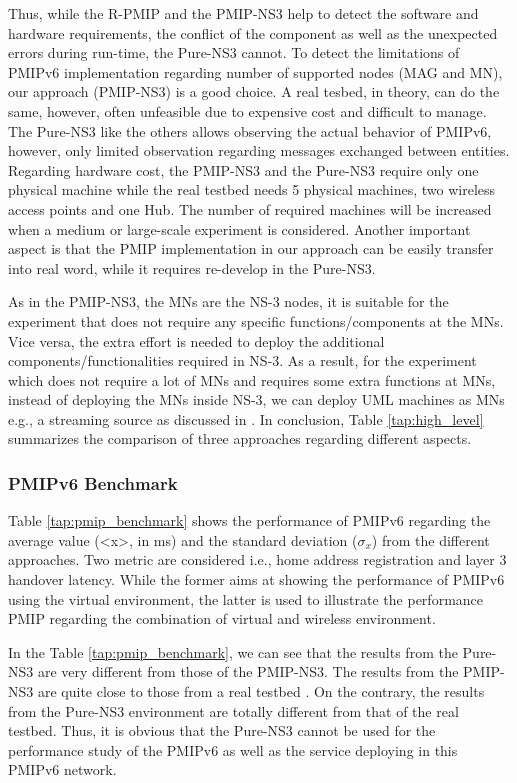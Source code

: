 Thus, while the R-PMIP and the PMIP-NS3 help to detect the software and hardware requirements, the conflict of the component as well as the unexpected errors during run-time, the Pure-NS3 cannot. To detect the limitations of PMIPv6 implementation regarding number of supported nodes (MAG and MN), our approach (PMIP-NS3) is a good choice. A real tesbed, in theory, can do the same, however, often unfeasible due to expensive cost and difficult to manage. The Pure-NS3 like the others allows observing the actual behavior of PMIPv6, however, only limited observation regarding messages exchanged between entities. Regarding hardware cost, the PMIP-NS3 and the Pure-NS3 require only one physical machine while the real testbed needs 5 physical machines, two wireless access points and one Hub. The number of required machines will be increased when a medium or large-scale experiment is considered. Another important aspect is that the PMIP implementation in our approach can be easily transfer into real word, while it requires re-develop in the Pure-NS3. 

As in the PMIP-NS3, the MNs are the NS-3 nodes, it is suitable for the experiment that does not require any specific functions/components at the MNs. Vice versa, the extra effort is needed to deploy the additional components/functionalities required in NS-3. As a result, for the experiment which does not require a lot of MNs and requires some extra functions at MNs, instead of deploying the MNs inside NS-3, we can deploy UML machines as MNs e.g., a streaming source as discussed in \cite{Thinh_Springer}. In conclusion, Table \ref{tap:high_level} summarizes the comparison of three approaches regarding different aspects. 
\subsubsection{PMIPv6 Benchmark}
Table \ref{tap:pmip_benchmark} shows the performance of PMIPv6 regarding the average value (<x>, in ms) and the standard deviation ($\sigma_{x}$) from the different approaches. Two metric are considered i.e., home address registration and layer 3 handover latency. While the former aims at showing the performance of PMIPv6 using the virtual environment, the latter is used to illustrate the performance PMIP regarding the combination of virtual and wireless environment.

In the Table \ref{tap:pmip_benchmark}, we can see that the results from the Pure-NS3 are very different from those of the PMIP-NS3. The results from the PMIP-NS3 are quite close to those from a real testbed \cite{oai_pmip}. On the contrary, the results from the Pure-NS3 environment are totally different from that of the real testbed. Thus, it is obvious that the Pure-NS3 cannot be used for the performance study of the PMIPv6 as well as the service deploying in this PMIPv6 network.\\

